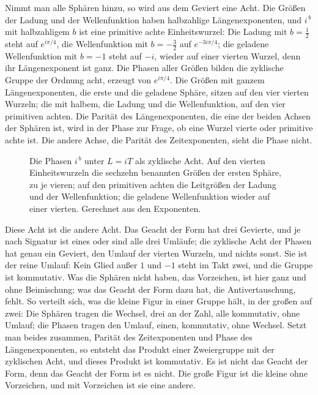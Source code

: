 \documentclass[11pt,a4paper]{article}
\begin{document}
Nimmt man alle Sphären hinzu, so wird aus dem Geviert eine Acht. Die Größen der Ladung und der Wellenfunktion haben halbzahlige Längenexponenten, und $i^{\,b}$ mit halbzahligem $b$ ist eine primitive achte Einheitswurzel: Die Ladung mit $b=\tfrac12$ steht auf $e^{i\pi/4}$, die Wellenfunktion mit $b=-\tfrac32$ auf $e^{-3i\pi/4}$; die geladene Wellenfunktion mit $b=-1$ steht auf $-i$, wieder auf einer vierten Wurzel, denn ihr Längenexponent ist ganz. Die Phasen aller Größen bilden die zyklische Gruppe der Ordnung acht, erzeugt von $e^{i\pi/4}$. Die Größen mit ganzem Längenexponenten, die erste und die geladene Sphäre, sitzen auf den vier vierten Wurzeln; die mit halbem, die Ladung und die Wellenfunktion, auf den vier primitiven achten. Die Parität des Längenexponenten, die eine der beiden Achsen der Sphären ist, wird in der Phase zur Frage, ob eine Wurzel vierte oder primitive achte ist. Die andere Achse, die Parität des Zeitexponenten, sieht die Phase nicht.

\begin{figure}[h]
\centering

\caption[Die Phasen der Größen]{Die Phasen $i^{\,b}$ unter $L=iT$ als zyklische Acht. Auf den vierten Einheitswurzeln die sechzehn benannten Größen der ersten Sphäre, zu je vieren; auf den primitiven achten die Leitgrößen der Ladung und der Wellenfunktion; die geladene Wellenfunktion wieder auf einer vierten. Gerechnet aus den Exponenten.}
\label{fig:phasen}
\end{figure}

Diese Acht ist die andere Acht. Das Geacht der Form hat drei Gevierte, und je nach Signatur ist eines oder sind alle drei Umläufe; die zyklische Acht der Phasen hat genau ein Geviert, den Umlauf der vierten Wurzeln, und nichts sonst. Sie ist der reine Umlauf: Kein Glied außer $1$ und $-1$ steht im Takt zwei, und die Gruppe ist kommutativ. Was die Sphären nicht haben, das Vorzeichen, ist hier ganz und ohne Beimischung; was das Geacht der Form dazu hat, die Antivertauschung, fehlt. So verteilt sich, was die kleine Figur in einer Gruppe hält, in der großen auf zwei: Die Sphären tragen die Wechsel, drei an der Zahl, alle kommutativ, ohne Umlauf; die Phasen tragen den Umlauf, einen, kommutativ, ohne Wechsel. Setzt man beides zusammen, Parität des Zeitexponenten und Phase des Längenexponenten, so entsteht das Produkt einer Zweiergruppe mit der zyklischen Acht, und dieses Produkt ist kommutativ. Es ist nicht das Geacht der Form, denn das Geacht der Form ist es nicht. Die große Figur ist die kleine ohne Vorzeichen, und mit Vorzeichen ist sie eine andere.
\end{document}
